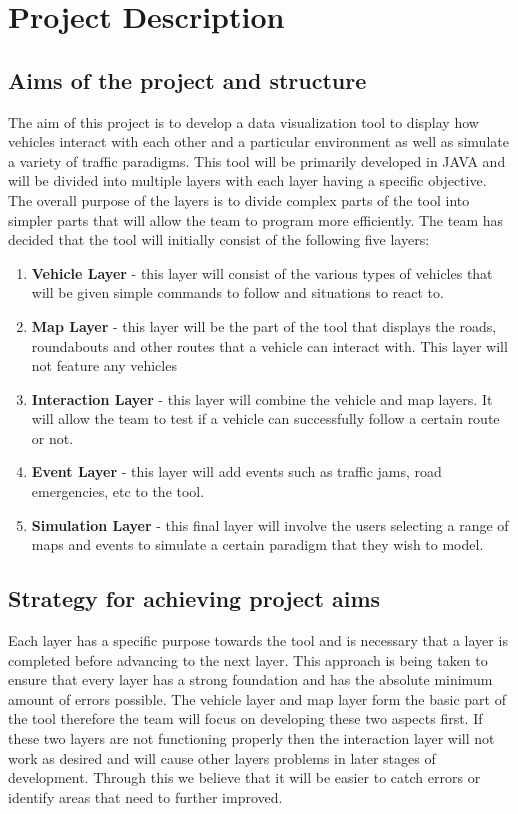 \chapter{Project Description}

\section{Aims of the project and structure}

\vspace{1em}
\noindent The aim of this project is to develop a data visualization tool to display how vehicles interact with each other and a particular environment as well as simulate a variety of traffic paradigms. This tool will be primarily developed in JAVA and will be divided into multiple layers with each layer having a specific objective. The overall purpose of the layers is to divide complex parts of the tool into simpler parts that will allow the team to program more efficiently. The team has decided that the tool will initially consist of the following five layers:


\begin{enumerate}
  \item \textbf{Vehicle Layer} -  this layer will consist of the various types of vehicles that will be given simple commands to follow and situations to react to.
  \item \textbf{Map Layer} - this layer will be the part of the tool that displays the roads, roundabouts and other routes that a vehicle can interact with. This layer will not feature any vehicles
  \item \textbf{Interaction Layer} - this layer will combine the vehicle and map layers. It will allow the team to test if a vehicle can successfully follow a certain route or not.
  \item \textbf{Event Layer} - this layer will add events such as traffic jams, road emergencies, etc to the tool. 
  \item \textbf{Simulation Layer} -  this final layer will involve the users selecting a range of maps and events to simulate a certain paradigm that they wish to model. 
\end{enumerate}

\vspace{1em}
\section{Strategy for achieving project aims}
\noindent
Each layer has a specific purpose towards the tool and is necessary that a layer is completed before advancing to the next layer. This approach is being taken to ensure that every layer has a strong foundation and has the absolute minimum amount of errors possible. The vehicle layer and map layer form the basic part of the tool therefore the team will focus on developing these two aspects first. If these two layers are not functioning properly then the interaction layer will not work as desired and will cause other layers problems in later stages of development. Through this we believe that it will be easier to catch errors or identify areas that need to further improved.

